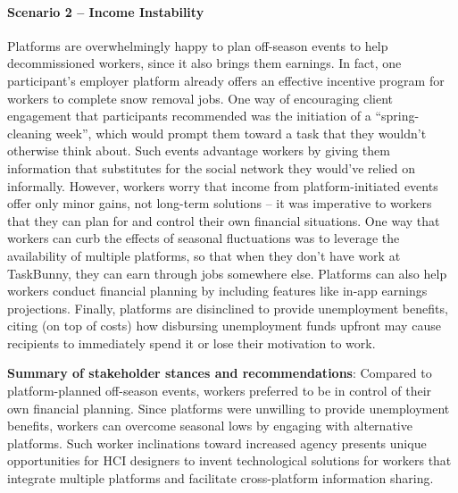 \paragraph{Scenario 2 -- Income Instability} \label{s2}
Platforms are overwhelmingly happy to plan off-season events to help decommissioned workers, since it also brings them earnings. In fact, one participant's employer platform already offers an effective incentive program for workers to complete snow removal jobs. One way of encouraging client engagement that participants recommended was the initiation of a ``spring-cleaning week'', which would prompt them toward a task that they wouldn't otherwise think about. Such events advantage workers by giving them information that substitutes for the social network they would've relied on informally. However, workers worry that income from platform-initiated events offer only minor gains, not long-term solutions -- it was imperative to workers that they can plan for and control their own financial situations. One way that workers can curb the effects of seasonal fluctuations was to leverage the availability of multiple platforms, so that when they don't have work at TaskBunny, they can earn through jobs somewhere else. Platforms can also help workers conduct financial planning by including features like in-app earnings projections. Finally, platforms are disinclined to provide unemployment benefits, citing (on top of costs) how disbursing unemployment funds upfront may cause recipients to immediately spend it or lose their motivation to work.





\textbf{Summary of stakeholder stances and recommendations}: Compared to platform-planned off-season events, workers preferred to be in control of their own financial planning. Since platforms were unwilling to provide unemployment benefits, workers can overcome seasonal lows by engaging with alternative platforms. Such worker inclinations toward increased agency presents unique opportunities for HCI designers to invent technological solutions for workers that integrate multiple platforms and facilitate cross-platform information sharing.

